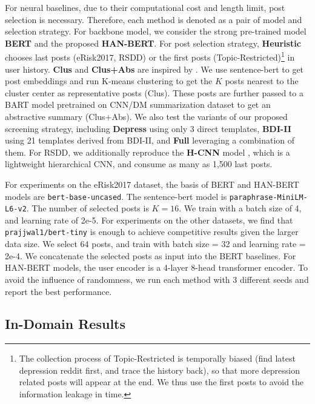 For neural baselines, due to their computational cost and length limit, post selection is necessary. Therefore, each method is denoted as a pair of model and selection strategy. For backbone model, we consider the strong pre-trained model \textbf{BERT} and the proposed \textbf{HAN-BERT}. For post selection strategy, \textbf{Heuristic} chooses last posts (eRisk2017, RSDD) or the first posts (Topic-Restricted)\footnote{The collection process of Topic-Restricted is temporally biased (find latest depression reddit first, and trace the history back), so that more depression related posts will appear at the end. We thus use the first posts to avoid the information leakage in time.} in user history. \textbf{Clus} and \textbf{Clus+Abs} are inspired by \citet{zogan2021depressionnet}. We use sentence-bert \citep{reimers-2019-sentence-bert} to get post embeddings and run K-means clustering to get the $K$ posts nearest to the cluster center as representative posts (Clus). These posts are further passed to a BART model \citep{lewis2020bart} pretrained on CNN/DM summarization dataset to get an abstractive summary (Clus+Abs). We also test the variants of our proposed screening strategy, including \textbf{Depress} using only 3 direct templates, \textbf{BDI-II} using 21 templates derived from BDI-II, and \textbf{Full} leveraging a combination of them. For RSDD, we additionally reproduce the \textbf{H-CNN} model \citep{yates2017depression}, which is a lightweight hierarchical CNN, and consume as many as 1,500 last posts.

For experiments on the eRisk2017 dataset, the basis of BERT and HAN-BERT models are \texttt{bert-base-uncased}. The sentence-bert model is \texttt{paraphrase-MiniLM-L6-v2}. The number of selected posts is $K=16$. We train with a batch size of 4, and learning rate of 2e-5. For experiments on the other datasets, we find that \texttt{prajjwal1/bert-tiny} is enough to achieve competitive results given the larger data size. We select 64 posts, and train with batch size = 32 and learning rate = 2e-4. We concatenate the selected posts as input into the BERT baselines. For HAN-BERT models, the user encoder is a 4-layer 8-head transformer encoder. To avoid the influence of randomness, we run each method with 3 different seeds and report the best performance.


\subsection{In-Domain Results}
\label{sec:in-domain}


